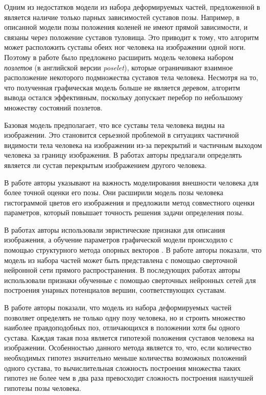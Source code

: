 Одним из недостатков модели из набора деформируемых частей, предложенной в \cite{yang2011articulated} является наличие только парных зависимостей суставов позы. Например,
в описанной модели позы положения коленей не имеют прямой зависимости, и связаны через положение суставов туловища. Это приводит к тому, что алгоритм может расположить суставы обеих ног человека на изображении одной ноги. Поэтому в работе \cite{pishchulin2013poselet} было предложено расширить модель человека набором \textit{позлетов} (в английской версии \textit{poselet}), которые ограничивают взаимное расположение некоторого подмножества суставов тела человека. Несмотря на то, что полученная графическая модель больше не является деревом, алгоритм вывода остался эффективным, поскольку допускает перебор по небольшому множеству состояний позлетов.

Базовая модель предполагает, что все суставы тела человека видны на изображении. Это становится серьезной проблемой в ситуациях частичной видимости тела человека на изображении из-за перекрытий и частичным выходом человека за границу изображения. В работах \cite{ghiasi2014parsing,chen2015parsing} авторы предлагали определять является ли сустав перекрытым изображением другого человека.

В работе \cite{chou2013modeling} авторы указывают на важность моделирования внешности человека для более точной оценки его позы. Они расширили модель позы человека гистограммой цветов его изображения и предложили метод совместного оценки параметров, который повышает точность решения задачи определения позы.

В работах \cite{yang2011articulated,pirsiavash2012steerable,ghiasi2014parsing,pishchulin2013poselet} авторы использовали эвристические признаки для описания изображения, а обучение параметров графической модели происходило с помощью структурного метода опорных векторов \cite{finley2008training}. В работе \cite{girshick2015deformable} авторы показали, что модель из набора частей может быть представлена с помощью сверточной нейронной сети прямого распространения. В последующих работах \cite{chen2014articulated,tompson2014joint,chen2015parsing} авторы использовали признаки обученные с помощью сверточных нейронных сетей для построения унарных потенциалов вершин, соответствующих суставам.

В работе \cite{park2011n} авторы показали, что модель из набора деформируемых частей позволяет определять не только одну позу человека, но и строить множество наиболее правдоподобных поз, отличающихся в положении хотя бы одного сустава. Каждая такая поза является гипотезой положения суставов человека на изображении. Особенностью данного метода является то, что, если количество необходимых гипотез значительно меньше количества возможных положений одного сустава, то вычислительная сложность построения множества таких гипотез не более чем в два раза превосходит сложность построения наилучшей гипотезы позы человека.

